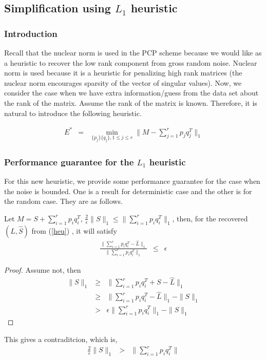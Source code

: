 \subsection{Simplification using $L_{1}$ heuristic}


\subsubsection{Introduction}

Recall that the nuclear norm is used in the PCP scheme because we would like as a heuristic to recover the low rank component from gross random noise. Nuclear norm is used because it is a heuristic for penalizing high rank matrices (the nuclear norm encourages sparsity of the vector of singular values). Now, we consider the case when we have extra information/guess from the data set about the rank of the matrix. Assume the rank of the matrix is known. Therefore, it is natural to introduce the following heuristic.

\begin{eqnarray}
E^{*} & = & \min_{\{p_{j}\}\{q_{j}\},1\le j\le r}\|M-\sum_{j=1}^{r}p_{j}q_{j}^{T}\|_{1}\label{heu}
\end{eqnarray}



\subsubsection{Performance guarantee for the $L_1$ heuristic}

For this new heuristic, we provide some performance guarantee for the case
when the noise is bounded. One is a result for deterministic case
and the other is for the random case. They are as follows.
\begin{prop}
Let $M=S+\sum_{i=1}^{r}p_{i}q_{i}^{T}$, $\frac{2}{\epsilon}\|S\|_{1}\le\|\sum_{i=1}^{r}p_{i}q_{i}^{T}\|_{1}$,
then, for the recovered $(\hat{L},\hat{S})$ from (\ref{heu}) , it
will satisfy
\begin{eqnarray*}
\frac{\|\sum_{i=1}^{r}p_{i}q_{i}^{T}-\hat{L}\|_{1}}{\|\sum_{i=1}^{r}p_{i}q_{i}^{T}\|_{1}} & \le & \epsilon
\end{eqnarray*}
\end{prop}
\begin{proof}
Assume not, then
\begin{eqnarray*}
\|S\|_{1} & \ge & \|\sum_{i=1}^{r}p_{i}q_{i}^{T}+S-\hat{L}\|_{1}\\
 & \ge & \|\sum_{i=1}^{r}p_{i}q_{i}^{T}-\hat{L}\|_{1}-\|S\|_{1}\\
 & > & \epsilon\|\sum_{i=1}^{r}p_{i}q_{i}^{T}\|_{1}-\|S\|_{1}
\end{eqnarray*}

\end{proof}
This gives a contraditcion, which is,
\begin{eqnarray*}
\frac{2}{\epsilon}\|S\|_{1} & > & \|\sum_{i=1}^{r}p_{i}q_{i}^{T}\|
\end{eqnarray*}


